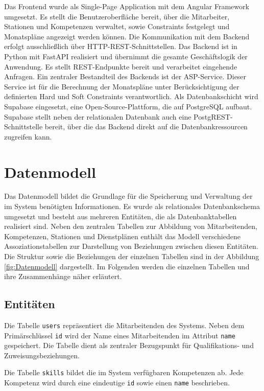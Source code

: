 Das Frontend wurde als Single-Page Application mit dem Angular Framework umgesetzt. Es stellt die Benutzeroberfläche bereit, über die Mitarbeiter, Stationen und Kompetenzen verwaltet, sowie Constraints festgelegt und Monatspläne angezeigt werden können. Die Kommunikation mit dem Backend erfolgt ausschließlich über HTTP-REST-Schnittstellen.
Das Backend ist in Python mit FastAPI realisiert und übernimmt die gesamte Geschäftslogik der Anwendung. Es stellt REST-Endpunkte bereit und verarbeitet eingehende Anfragen. Ein zentraler Bestandteil des Backends ist der ASP-Service. Dieser Service ist für die Berechnung der Monatspläne unter Berücksichtigung der definierten Hard und Soft Constraints verantwortlich.
Als Datenbankschicht wird Supabase eingesetzt, eine Open-Source-Plattform, die auf PostgreSQL aufbaut. Supabase stellt neben der relationalen Datenbank auch eine PostgREST-Schnittstelle bereit, über die das Backend direkt auf die Datenbankressourcen zugreifen kann.

\section{Datenmodell}

Das Datenmodell bildet die Grundlage für die Speicherung und Verwaltung der im System benötigten Informationen. Es wurde als relationales Datenbankschema umgesetzt und besteht aus mehreren Entitäten, die als Datenbanktabellen realisiert sind. Neben den zentralen Tabellen zur Abbildung von Mitarbeitenden, Kompetenzen, Stationen und Dienstplänen enthält das Modell verschiedene Assoziationstabellen zur Darstellung von Beziehungen zwischen diesen Entitäten. Die Struktur sowie die Beziehungen der einzelnen Tabellen sind in der Abbildung \ref{fig:Datenmodell} dargestellt. Im Folgenden werden die einzelnen Tabellen und ihre Zusammenhänge näher erläutert.

\subsection{Entitäten}

Die Tabelle \texttt{users} repräsentiert die Mitarbeitenden des Systems. Neben dem Primärschlüssel \texttt{id} wird der Name eines Mitarbeitenden im Attribut \texttt{name} gespeichert. Die Tabelle dient als zentraler Bezugspunkt für Qualifikations- und Zuweisungsbeziehungen.

Die Tabelle \texttt{skills} bildet die im System verfügbaren Kompetenzen ab. Jede Kompetenz wird durch eine eindeutige \texttt{id} sowie einen \texttt{name} beschrieben.

